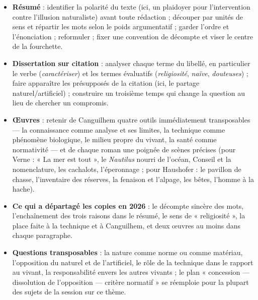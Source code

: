 \documentclass[11pt,a4paper]{article}
\providecommand{\tightlist}{\setlength{\itemsep}{0pt}\setlength{\parskip}{0pt}}
\begin{document}
\begin{itemize}
\tightlist
\item
  \textbf{Résumé} : identifier la polarité du texte (ici, un plaidoyer pour l'intervention contre l'illusion naturaliste) avant toute rédaction ; découper par unités de sens et répartir les mots selon le poids argumentatif ; garder l'ordre et l'énonciation ; reformuler ; fixer une convention de décompte et viser le centre de la fourchette.
\item
  \textbf{Dissertation sur citation} : analyser chaque terme du libellé, en particulier le verbe (\emph{caractériser}) et les termes évaluatifs (\emph{religiosité}, \emph{naïve}, \emph{douteuses}) ; faire apparaître les présupposés de la citation (ici, le partage naturel/artificiel) ; construire un troisième temps qui change la question au lieu de chercher un compromis.
\item
  \textbf{Œuvres} : retenir de Canguilhem quatre outils immédiatement transposables --- la connaissance comme analyse et ses limites, la technique comme phénomène biologique, le milieu propre du vivant, la santé comme normativité --- et de chaque roman une poignée de scènes précises (pour Verne : « La mer est tout », le \emph{Nautilus} nourri de l'océan, Conseil et la nomenclature, les cachalots, l'éperonnage ; pour Haushofer : le pavillon de chasse, l'inventaire des réserves, la fenaison et l'alpage, les bêtes, l'homme à la hache).
\item
  \textbf{Ce qui a départagé les copies en 2026} : le décompte sincère des mots, l'enchaînement des trois raisons dans le résumé, le sens de « religiosité », la place faite à la technique et à Canguilhem, et deux œuvres au moins dans chaque paragraphe.
\item
  \textbf{Questions transposables} : la nature comme norme ou comme matériau, l'opposition du naturel et de l'artificiel, le rôle de la technique dans le rapport au vivant, la responsabilité envers les autres vivants ; le plan « concession --- dissolution de l'opposition --- critère normatif » se réemploie pour la plupart des sujets de la session sur ce thème.
\end{itemize}
\end{document}
